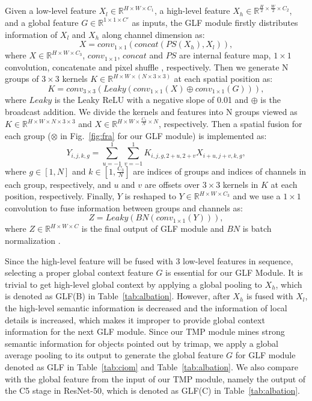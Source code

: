 \documentclass[10pt,twocolumn,letterpaper]{article}
\begin{document}
Given a low-level feature  $X_l \in \mathbb{R}^{ H \times W\times C_1}$, a high-level feature  $X_h \in \mathbb{R}^{\frac{H}{2} \times \frac{W}{2}\times C_2}$, and  a global feature $G\in \mathbb{R}^{1 \times 1\times C'}$ as inputs, the GLF module firstly distributes information of $X_l$ and $X_h$ along channel dimension as:
\begin{equation}
	X = conv_{1\times 1}(concat(PS(X_h),X_l)) ,
	\label{fuse1}
\end{equation}
where $X \in \mathbb{R}^{H \times W\times C_3}$, $conv_{1\times 1}$, $concat$ and $PS$ are internal feature map, $1\times 1$ convolution, concatenate and pixel shuffle \cite{ps}, respectively. Then we generate N groups of $3\times 3$ kernels $K\in \mathbb{R}^{H \times W\times (N\times 3 \times 3)}$ at each spatial position as:
\begin{equation}
	K = conv_{3\times 3} (Leaky(conv_{1\times 1}(X)\oplus conv_{1\times 1}(G))) ,
	\label{kernel}
\end{equation}
where $Leaky$ is the Leaky ReLU \cite{leaky} with a negative slope of 0.01 and $\oplus$ is the broadcast addition. We divide the kernels and features into N groups viewed as $K \in \mathbb{R}^{H\times W\times N \times 3\times 3}$ and $X\in  \mathbb{R}^{H\times W \times \frac{C_3}{N}\times N}$, respectively. Then a spatial fusion for each group ($\otimes$ in Fig.~\ref{fig:fra} for our GLF module) is implemented as:
\begin{equation}
	Y_{i,j,k,g} = \sum\limits_{u=-1}^{1} \sum\limits_{v=-1}^{1}K_{i,j,g,2+u,2+v}X_{i+u,j+v,k,g},
	\label{dynamic}
\end{equation}
where $g \in [1,N]$ and $k \in [1,\frac{C_3}{N}]$ are indices of groups and indices of channels in each group, respectively, and $u$ and  $v$ are offsets over $3\times 3$ kernels in $K$ at each position, respectively. Finally, $Y$ is reshaped to $Y\in  \mathbb{R}^{H \times W\times C_3}$ and we use a $1\times 1$ convolution to fuse information between groups and channels as:
\begin{equation}
	Z = Leaky(BN(conv_{1\times 1}(Y))),
	\label{fuse2}
\end{equation}
where $Z\in \mathbb{R}^{H \times W\times C}$ is the final output of GLF module and $BN$ is batch normalization \cite{bn}.

Since the high-level feature will be fused with 3 low-level features in sequence, selecting a proper global context feature $G$ is essential for our GLF Module. It is trivial to get high-level global context by applying a global pooling to $X_h$, which is denoted as GLF(B) in Table~\ref{tab:albation}. However, after $X_h$ is fused with $X_l$, the high-level semantic information is decreased and the information of local details is increased, which makes it improper to provide global context information for the next GLF module. Since our TMP module mines strong semantic information for  objects pointed out by trimap, we apply a  global average pooling to its output to generate the global feature $G$ for GLF module denoted as GLF in  Table~\ref{tab:ciom} and Table~\ref{tab:albation}. We also compare with the global feature from the input of our TMP module, namely the output of the C5 stage in ResNet-50, which is denoted as GLF(C) in Table~\ref{tab:albation}.
\end{document}
